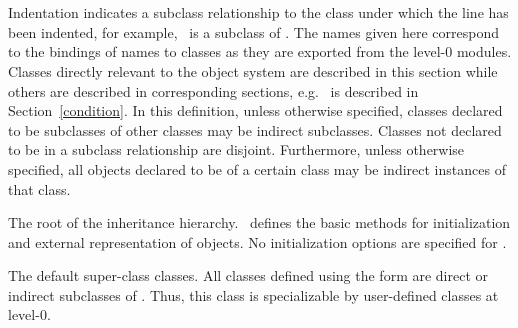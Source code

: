 \begin{optDefinition}
\begin{figure}
{\tts\tts\tts{}\\
\tts\tts\tts{}\\
\tts{} \\
\tts\tts{}\\
\tts\tts{}\\
\tts{} \\
\tts\tts{}\\
}%
\end{figure}
%
Indentation indicates a subclass relationship to the class under which the line
has been indented, for example, \ is a subclass of
.  The names given here correspond to the bindings of names to
classes as they are exported from the level-0 modules.  Classes directly
relevant to the object system are described in this section while others are
described in corresponding sections, e.g. \ is described in
Section~\ref{condition}.
%
In this definition, unless otherwise specified, classes declared to be
subclasses of other classes may be indirect subclasses. Classes not declared to
be in a subclass relationship are disjoint.  Furthermore, unless otherwise
specified, all objects declared to be of a certain class may be indirect
instances of that class.

%
The root of the inheritance hierarchy. \ defines the basic
methods for initialization and external representation of objects.  No
initialization options are specified for .

%
The default super-class classes.  All classes defined using the
 form are direct or indirect subclasses of
.  Thus, this class is specializable by user-defined classes at
level-0.
%
\end{optDefinition}

